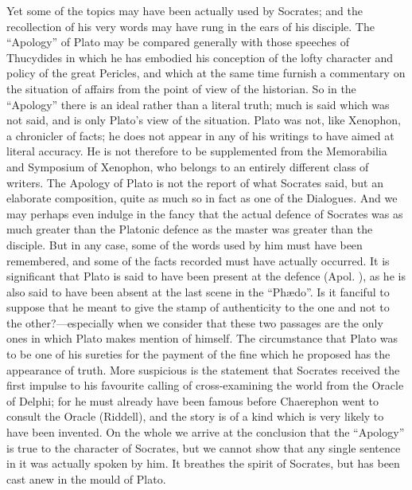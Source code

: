 \documentclass[11pt,letter]{article}
\begin{document}
\par  Yet some of the topics may have been actually used by Socrates; and the recollection of his very words may have rung in the ears of his disciple. The “Apology” of Plato may be compared generally with those speeches of Thucydides in which he has embodied his conception of the lofty character and policy of the great Pericles, and which at the same time furnish a commentary on the situation of affairs from the point of view of the historian. So in the “Apology” there is an ideal rather than a literal truth; much is said which was not said, and is only Plato’s view of the situation. Plato was not, like Xenophon, a chronicler of facts; he does not appear in any of his writings to have aimed at literal accuracy. He is not therefore to be supplemented from the Memorabilia and Symposium of Xenophon, who belongs to an entirely different class of writers. The Apology of Plato is not the report of what Socrates said, but an elaborate composition, quite as much so in fact as one of the Dialogues. And we may perhaps even indulge in the fancy that the actual defence of Socrates was as much greater than the Platonic defence as the master was greater than the disciple. But in any case, some of the words used by him must have been remembered, and some of the facts recorded must have actually occurred. It is significant that Plato is said to have been present at the defence (Apol. ), as he is also said to have been absent at the last scene in the “Phædo”. Is it fanciful to suppose that he meant to give the stamp of authenticity to the one and not to the other?—especially when we consider that these two passages are the only ones in which Plato makes mention of himself. The circumstance that Plato was to be one of his sureties for the payment of the fine which he proposed has the appearance of truth. More suspicious is the statement that Socrates received the first impulse to his favourite calling of cross-examining the world from the Oracle of Delphi; for he must already have been famous before Chaerephon went to consult the Oracle (Riddell), and the story is of a kind which is very likely to have been invented. On the whole we arrive at the conclusion that the “Apology” is true to the character of Socrates, but we cannot show that any single sentence in it was actually spoken by him. It breathes the spirit of Socrates, but has been cast anew in the mould of Plato.
\end{document}
